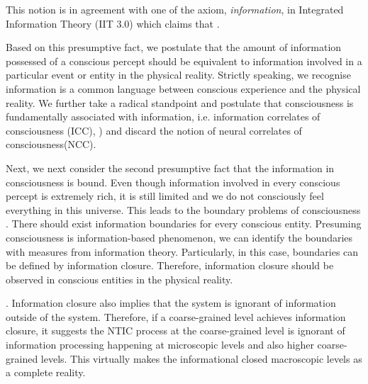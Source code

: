 \documentclass[utf8]{article}
\begin{document}
        This notion is in agreement with one of the axiom, \textit{information}, in Integrated Information Theory (IIT 3.0) which claims that  \citep[p. 2]{oizumi2014phenomenology}.
        
        Based on this presumptive fact, we postulate that the amount of information possessed of a conscious percept should be equivalent to information involved in a particular event or entity in the physical reality. Strictly speaking, we recognise information is a common language between conscious experience and the physical reality. We further take a radical standpoint and postulate that consciousness is fundamentally associated with information, i.e. information correlates of consciousness (ICC), \cite{chalmers1996conscious, tononi2004information, gamez2011information, Gamez2016}) and discard the notion of neural correlates of consciousness(NCC). 
        
        Next, we next consider the second presumptive fact that the information in consciousness is bound. Even though information involved in every conscious percept is extremely rich, it is still limited and we do not consciously feel everything in this universe. This leads to the boundary problems of consciousness \cite{goff2006experiences}. There should exist information boundaries for every conscious entity. Presuming consciousness is information-based phenomenon, we can identify the boundaries with measures from information theory. Particularly, in this case, boundaries can be defined by information closure. Therefore, information closure should be observed in conscious entities in the physical reality. 
        
        
        . 
        Information closure also implies that the system is ignorant of information outside of the system. Therefore, if a coarse-grained level achieves information closure, it suggests the NTIC process at the coarse-grained level is ignorant of information processing happening at microscopic levels and also higher coarse-grained levels. This virtually makes the informational closed macroscopic levels as a complete reality. 
        
\end{document}
